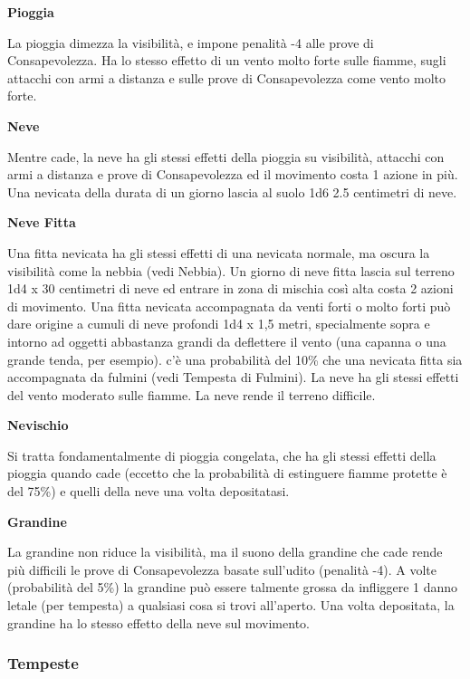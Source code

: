 \documentclass[a4paper,11pt,twoside,openany]{book}
\begin{document}
\textbf{Pioggia}

La pioggia dimezza la visibilità, e impone penalità -4 alle prove di Consapevolezza. Ha lo stesso effetto di un vento molto forte sulle fiamme, sugli attacchi con armi a distanza e sulle prove di Consapevolezza come vento molto forte.

\textbf{Neve}

Mentre cade, la neve ha gli stessi effetti della pioggia su visibilità, attacchi con armi a distanza e prove di Consapevolezza ed il movimento costa 1 azione in più. Una nevicata della durata di un giorno lascia al suolo 1d6 \texttimes{} 2.5 centimetri di neve.

\textbf{Neve Fitta}

Una fitta nevicata ha gli stessi effetti di una nevicata normale, ma oscura la visibilità come la nebbia (vedi Nebbia). Un giorno di neve fitta lascia sul terreno 1d4 x 30 centimetri di neve ed entrare in zona di mischia così alta costa 2 azioni di movimento. Una fitta nevicata accompagnata da venti forti o molto forti può dare origine a cumuli di neve profondi 1d4 x 1,5 metri, specialmente sopra e intorno ad oggetti abbastanza grandi da deflettere il vento (una capanna o una grande tenda, per esempio).
c'è una probabilità del 10\% che una nevicata fitta sia accompagnata da fulmini (vedi Tempesta di Fulmini). La neve ha gli stessi effetti del vento moderato sulle fiamme. La neve rende il terreno difficile.

\textbf{Nevischio}

Si tratta fondamentalmente di pioggia congelata, che ha gli stessi effetti della pioggia quando cade (eccetto che la probabilità di estinguere fiamme protette è del 75\%) e quelli della neve una volta depositatasi.

\textbf{Grandine}

La grandine non riduce la visibilità, ma il suono della grandine che cade rende più difficili le prove di Consapevolezza basate sull'udito (penalità -4). A volte (probabilità del 5\%) la grandine può essere talmente grossa da infliggere 1 danno letale (per tempesta) a qualsiasi cosa si trovi all'aperto. Una volta depositata, la grandine ha lo stesso effetto della neve sul movimento.

\subsubsection{Tempeste}

\label{tempeste}
\end{document}
